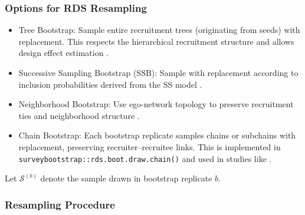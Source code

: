 \documentclass[
  12pt,
  letterpaper,
  DIV=11,
  numbers=noendperiod]{scrartcl}
\providecommand{\tightlist}{%
  \setlength{\itemsep}{0pt}\setlength{\parskip}{0pt}}
\theoremstyle{plain}
\theoremstyle{definition}
\begin{document}
\subsubsection{Options for RDS
Resampling}\label{options-for-rds-resampling}

\begin{itemize}
\tightlist
\item
  Tree Bootstrap: Sample entire recruitment trees (originating from
  seeds) with replacement. This respects the hierarchical recruitment
  structure and allows design effect estimation
  \autocite{salg06-variance}.
\item
  Successive Sampling Bootstrap (SSB): Sample with replacement according
  to inclusion probabilities derived from the SS model
  \autocite{gile11-improved}.
\item
  Neighborhood Bootstrap: Use ego-network topology to preserve
  recruitment ties and neighborhood structure
  \autocite{yauc22-neighborhood}.
\item
  Chain Bootstrap: Each bootstrap replicate samples chains or subchains
  with replacement, preserving recruiter--recruitee links. This is
  implemented in \texttt{surveybootstrap::rds.boot.draw.chain()} and
  used in studies like \textcite{weir12-comparison}.
\end{itemize}

Let \(\mathcal{S}^{(b)}\) denote the sample drawn in bootstrap replicate
\(b\).

\subsubsection{Resampling Procedure}\label{resampling-procedure}
\end{document}
